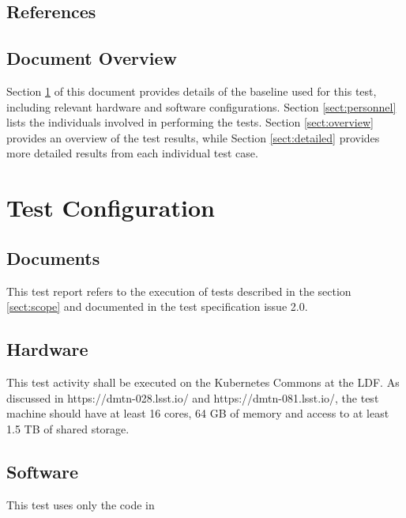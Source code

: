 \documentclass[DM,lsstdraft,STR,toc]{lsstdoc}
\begin{document}
\subsection{References}
\label{sect:references}

\renewcommand{\refname}{}


\subsection{Document Overview}
\label{sect:docoverview}

Section \ref{sect:configuration} of this document provides details of the \product{} baseline used for this test, including relevant hardware and software configurations.
Section \ref{sect:personnel} lists the individuals involved in performing the tests.
Section \ref{sect:overview} provides an overview of the test results, while Section \ref{sect:detailed} provides more detailed results from each individual test case.

\section{Test Configuration}
\label{sect:configuration}

\subsection{Documents}

This test report refers to the execution of tests described in the section \ref{sect:scope} and documented in the  test specification issue 2.0.

\subsection{Hardware}
\label{sect:hwconf}

This test activity shall be executed on the Kubernetes Commons at the LDF.
As discussed in https://dmtn-028.lsst.io/ and https://dmtn-081.lsst.io/, the test machine should have at least 16 cores, 64 GB of memory and access to at least 1.5 TB of shared storage.

\subsection{Software}
\label{sect:swconf}

This test uses only the code in
 
\end{document}
